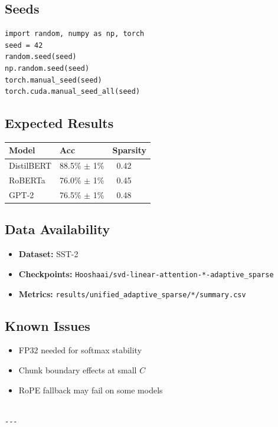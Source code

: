 \subsection{Seeds}

\begin{lstlisting}
import random, numpy as np, torch
seed = 42
random.seed(seed)
np.random.seed(seed)
torch.manual_seed(seed)
torch.cuda.manual_seed_all(seed)
\end{lstlisting}

\subsection{Expected Results}

\begin{table}[H]
\centering
\small
\begin{tabular}{lll}
\toprule
\textbf{Model} & \textbf{Acc} & \textbf{Sparsity} \\
\midrule
DistilBERT & 88.5\% $\pm$ 1\% & ~0.42 \\
RoBERTa & 76.0\% $\pm$ 1\% & ~0.45 \\
GPT-2 & 76.5\% $\pm$ 1\% & ~0.48 \\
\bottomrule
\end{tabular}
\end{table}

\subsection{Data Availability}

\begin{itemize}
\item \textbf{Dataset:} SST-2
\item \textbf{Checkpoints:} \texttt{Hooshaai/svd-linear-attention-*-adaptive\_sparse}
\item \textbf{Metrics:} \texttt{results/unified\_adaptive\_sparse/*/summary.csv}

\end{itemize}
\subsection{Known Issues}

\begin{itemize}
\item FP32 needed for softmax stability
\item Chunk boundary effects at small $C$
\item RoPE fallback may fail on some models
\end{itemize}
\begin{lstlisting}

---
\end{lstlisting}